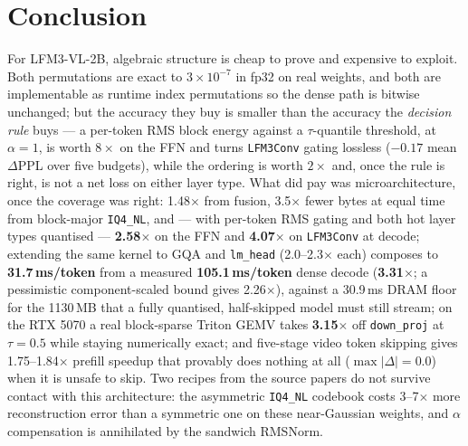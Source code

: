\documentclass[11pt]{article}
\newcommand{\code}[1]{\texttt{\small #1}}
\begin{document}
\section{Conclusion}
For LFM3-VL-2B, algebraic structure is cheap to prove and expensive to exploit. Both
permutations are exact to $3\times10^{-7}$ in fp32 on real weights, and both are
implementable as runtime index permutations so the dense path is bitwise unchanged; but
the accuracy they buy is smaller than the accuracy the \emph{decision rule} buys --- a
per-token RMS block energy against a $\tau$-quantile threshold, at $\alpha{=}1$, is worth
$8\times$ on the FFN and turns \code{LFM3Conv} gating lossless ($-0.17$ mean $\Delta$PPL
over five budgets), while the ordering is worth $2\times$ and, once the rule is right, is
not a net loss on either layer type. What did pay was microarchitecture, once the coverage
was right: 1.48$\times$ from
fusion, 3.5$\times$ fewer bytes at equal time from block-major \code{IQ4\_NL}, and
--- with per-token RMS gating and both hot layer types quantised --- \textbf{2.58$\times$}
on the FFN and \textbf{4.07$\times$} on \code{LFM3Conv} at decode; extending the same
kernel to GQA and \code{lm\_head} (2.0--2.3$\times$ each) composes to
\textbf{31.7\,ms/token} from a measured \textbf{105.1\,ms/token} dense decode
(\textbf{3.31$\times$}; a pessimistic component-scaled bound gives 2.26$\times$), against a
30.9\,ms DRAM floor for the 1130\,MB that a fully quantised, half-skipped model must still
stream; on the RTX 5070 a real block-sparse Triton GEMV
takes \textbf{3.15$\times$} off \code{down\_proj} at $\tau{=}0.5$ while staying
numerically exact; and five-stage video token skipping gives 1.75--1.84$\times$ prefill
speedup that provably does nothing at all ($\max|\Delta| = 0.0$) when it is unsafe to
skip. Two recipes from the source papers do not survive contact with this architecture:
the asymmetric \code{IQ4\_NL} codebook costs 3--7$\times$ more reconstruction error than a
symmetric one on these near-Gaussian weights, and $\alpha$ compensation is annihilated by
the sandwich RMSNorm.

\appendix
\end{document}
